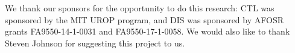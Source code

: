 \documentclass[11pt]{article}
\begin{document}

We thank our sponsors for the opportunity to do this research: CTL was sponsored by the MIT UROP program, and DIS was sponsored by AFOSR grants FA9550-14-1-0031 and FA9550-17-1-0058. We would also like to thank Steven Johnson for suggesting this project to us.
\end{document}
